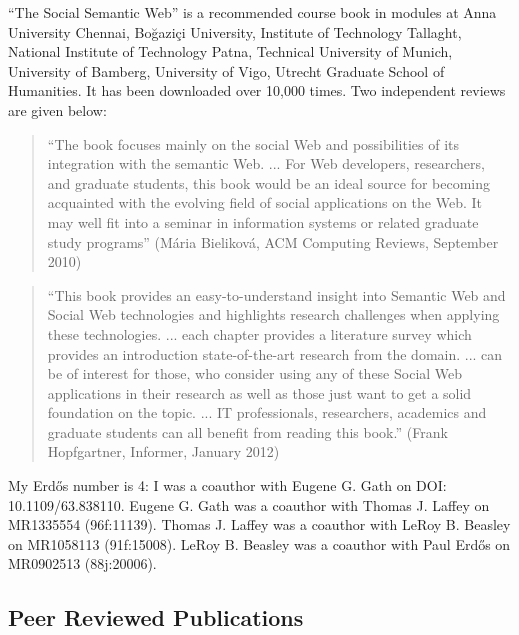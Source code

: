 \documentclass[10pt,a4paper]{res} %
\begin{document}
\begin{resume}
``The Social Semantic Web'' is a recommended course book in modules at Anna University Chennai, Bo\u{g}azi\c{c}i University, Institute of Technology Tallaght, National Institute of Technology Patna, Technical University of Munich, University of Bamberg, University of Vigo, Utrecht Graduate School of Humanities. It has been downloaded over 10,000 times. Two independent reviews are given below:

\medskip
\begin{quotation}``The book focuses mainly on the social Web and possibilities of its integration with the semantic Web. ... For Web developers, researchers, and graduate students, this book would be an ideal source for becoming acquainted with the evolving field of social applications on the Web. It may well fit into a seminar in information systems or related graduate study programs'' (M\'{a}ria Bielikov\'{a}, ACM Computing Reviews, September 2010)\end{quotation}

\medskip
\begin{quotation}``This book provides an easy-to-understand insight into Semantic Web and Social Web technologies and highlights research challenges when applying these technologies. ... each chapter provides a literature survey which provides an introduction state-of-the-art research from the domain. ... can be of interest for those, who consider using any of these Social Web applications in their research as well as those just want to get a solid foundation on the topic. ... IT professionals, researchers, academics and graduate students can all benefit from reading this book.'' (Frank Hopfgartner, Informer, January 2012)\end{quotation}

My Erd\H{o}s number is 4: I was a coauthor with Eugene G. Gath on DOI: 10.1109/63.838110. Eugene G. Gath was a coauthor with Thomas J. Laffey on MR1335554 (96f:11139). Thomas J. Laffey was a coauthor with LeRoy B. Beasley on MR1058113 (91f:15008). LeRoy B. Beasley was a coauthor with Paul Erd\H{o}s on MR0902513 (88j:20006).

\nocite{*}

\subsection*{Peer Reviewed Publications}

\printbibliography[type=book,title={Books},heading=bibnumbered]
\printbibliography[type=inbook,title={Book Chapters},heading=bibnumbered]
\printbibliography[type=article,title={Journal Papers},heading=bibnumbered]
\printbibliography[type=inproceedings,title={Conference and Workshop Papers},heading=bibnumbered]
\printbibliography[type=unpublished,title={Abstracts},heading=bibnumbered]


\end{resume}
\end{document}
